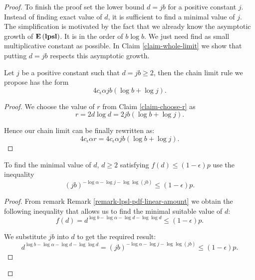 \begin{proof}
To finish the proof set the lower bound $d = j b$ for a positive constant $j$. Instead of finding exact value of $d$, it is sufficient to find a minimal value of $j$. The simplification is motivated by the fact that we already know the asymptotic growth of $\mathbf{E}\left(\mathbf{lpsl}\right)$. It is in the order of $b \log b$. We just need find as small multiplicative constant as possible. In Claim \ref{claim-whole-limit} we show that putting $d = jb$ respects this asymptotic growth.

\begin{claim}
\label{claim-whole-limit}
Let $j$ be a positive constant such that $d = jb \geq 2 $, then the chain limit rule we propose has the form \[ 4 c_\epsilon \alpha j b (\log b + \log j) \text{.} \]
\end{claim}
\begin{proof}
We choose the value of $r$ from Claim \ref{claim-choose-r} as
\[
	r = 2 d \log d = 2 j b (\log b + \log j) \text{.}
\]

Hence our chain limit can be finally rewritten as:
\[
	4 c_\epsilon \alpha r = 4 c_\epsilon \alpha j b (\log b + \log j) \text{.}
\]
\end{proof}

\begin{claim}
To find the minimal value of $d$, $d \geq 2$ satisfying $f(d) \leq (1 - \epsilon) p$ use the inequality
\begin{equation}
\label{inequality-formula-j}
	\left(j b\right)^{-\log \alpha -\log j - \log \log (j b)} \leq (1 - \epsilon)p \text{.}
\end{equation}
\end{claim}
\begin{proof}
From remark Remark \ref{remark-lpsl-pdf-linear-amount} we obtain the following inequality that allows us to find the minimal suitable value of $d$:
\[
	f(d) = d ^ {\log b - \log \alpha - \log d - \log \log d} \leq (1 - \epsilon) p \text{.}
\]

We substitute $j b$ into $d$ to get the required result:
\[
	d ^ {\log b - \log \alpha - \log d - \log \log d} = \left(j b\right)^{-\log \alpha -\log j - \log \log (j b)} \leq (1 - \epsilon)p \text{.}
\]
\end{proof}


\end{proof}
